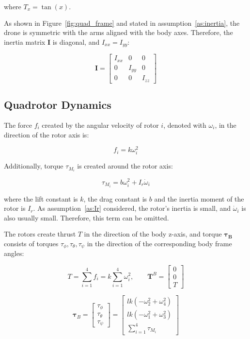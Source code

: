 \documentclass[letterpaper, 10 pt, conference]{ieeeconf}  %
\begin{document}
where $T_{x}=\tan (x)$.

As shown in Figure~\ref{fig:quad_frame} and stated in assumption~\ref{as:inertia}, the drone is symmetric with the arms aligned with the body axes. Therefore, the inertia matrix $\textbf{I}$ is diagonal, and $I_{xx} = I_{yy}$:

 $$\bm{I}=\left[ \begin{array}{ccc}{I_{x x}} & {0} & {0} \\ {0} & {I_{y y}} & {0} \\ {0} & {0} & {I_{z z}}\end{array}\right]$$
 
 \subsection{Quadrotor Dynamics}

The force $f_i$ created by the angular velocity of rotor $i$, denoted with $\omega_i$, in the direction of the rotor axis is:

$$f_{i}=k \omega_{i}^{2}$$

Additionally, torque $\tau_{M_i}$ is created around the rotor axis:

$$\tau_{M_{i}} = b \omega_{i}^{2} + I_{r} \dot{\omega}_{i} $$

where the lift constant is $k$, the drag constant is $b$ and the inertia moment of the rotor is $I_{r}$. As assumption~\ref{as:Ir} considered, the rotor's inertia is small, and $\dot{\omega}_{i}$ is also usually small. Therefore, this term can be omitted.

The rotors create thrust $T$ in the direction of the body z-axis, and torque $\bm{\tau_B}$ consists of torques $\tau_\phi, \tau_\theta, \tau_\psi$ in the direction of the corresponding body frame angles:

$$T=\sum_{i=1}^{4} f_{i}=k \sum_{i=1}^{4} \omega_{i}^{2}, \quad \quad \bm{T}^{B}=\left[ \begin{array}{c}{0} \\ {0} \\ {T}\end{array}\right]$$

$$
\bm{\tau}_{B}=\left[ \begin{array}{c}{\tau_{\phi}} \\ {\tau_{\theta}} \\ {\tau_{\psi}}\end{array}\right]=
\left[ \begin{array}{c}{l k\left(-\omega_{2}^{2}+\omega_{4}^{2}\right)} \\ {l k\left(-\omega_{1}^{2}+\omega_{3}^{2}\right)} \\ {\sum_{i=1}^{4} \tau_{M_{i}}}\end{array}\right]
$$
\end{document}
